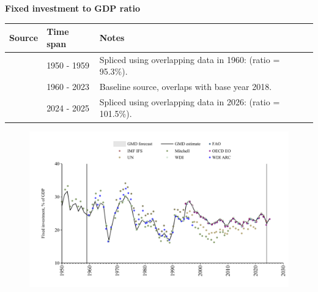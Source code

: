 \documentclass[12pt,a4paper,landscape]{article}
\begin{document}
\begin{adjustbox}{max totalsize={\paperwidth}{\paperheight},center}
\begin{minipage}[t][\textheight][t]{\textwidth}
\vspace*{0.5cm}
{}
\begin{center}
{\Large\bfseries Fixed investment to GDP ratio}
\end{center}
\vspace{0.5cm}
\begin{table}[H]
\centering
\small
\begin{tabular}{|l|l|l|}
\hline
\textbf{Source} & \textbf{Time span} & \textbf{Notes} \\
\hline
\rowcolor{white}\cite{Mitchell}& 1950 - 1959 &Spliced using overlapping data in 1960: (ratio = 95.3\%). \\
\rowcolor{lightgray}\cite{WDI}& 1960 - 2023 &Baseline source, overlaps with base year 2018. \\
\rowcolor{white}\cite{OECD_EO}& 2024 - 2025 &Spliced using overlapping data in 2026: (ratio = 101.5\%). \\
\hline
\end{tabular}
\end{table}
\begin{figure}[H]
\centering
\includegraphics[width=\textwidth,height=0.6\textheight,keepaspectratio]{graphs/ISR_finv_GDP.pdf}
\end{figure}
\end{minipage}
\end{adjustbox}
\end{document}
